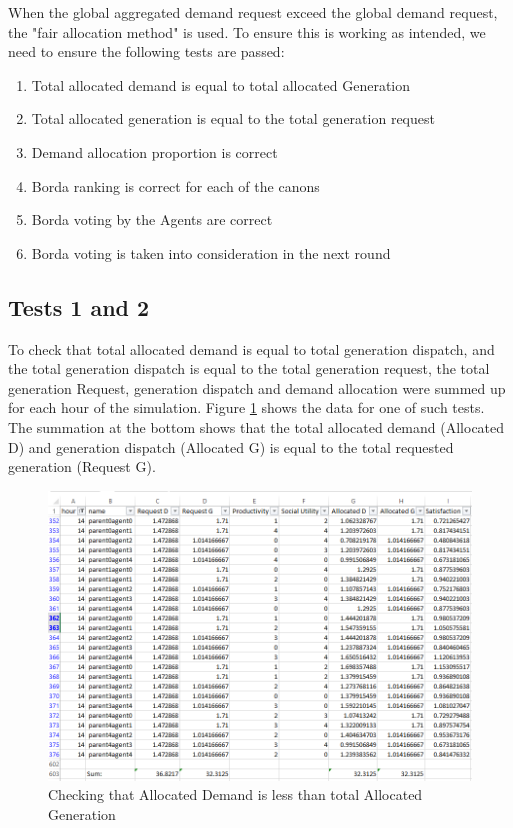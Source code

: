 When the global aggregated demand request exceed the global demand request, the "fair allocation method" is used. To ensure this is working as intended, we need to ensure the following tests are passed:

\begin{enumerate}
	\item Total allocated demand is equal to total allocated Generation
	\item Total allocated generation is equal to the total generation request
	\item Demand allocation proportion is correct
	\item Borda ranking is correct for each of the canons
	\item Borda voting by the Agents are correct
	\item Borda voting is taken into consideration in the next round
\end{enumerate}

\subsection*{Tests 1 and 2}
To check that total allocated demand is equal to total generation dispatch, and the total generation dispatch is equal to the total generation request, the total generation Request, generation dispatch and demand allocation were summed up for each hour of the simulation.  Figure \ref{fig:test3} shows the data for one of such tests. The summation at the bottom shows that the total allocated demand (Allocated D) and generation dispatch (Allocated G) is equal to the total requested generation (Request G).

\begin{figure}[h!]
	\centering
	\includegraphics[scale=0.4]{Images/test-allocation2.png}
	\caption{Checking that Allocated Demand is less than total Allocated Generation}
	\label{fig:test3}
\end{figure}


